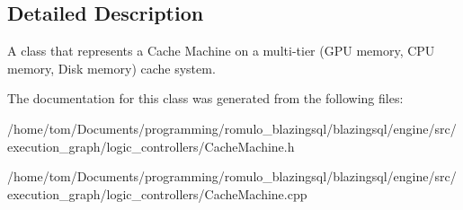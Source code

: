 \subsection{Detailed Description}
A class that represents a Cache Machine on a multi-\/tier (G\+PU memory, C\+PU memory, Disk memory) cache system. 

The documentation for this class was generated from the following files\+:\begin{DoxyCompactItemize}
\item 
/home/tom/\+Documents/programming/romulo\+\_\+blazingsql/blazingsql/engine/src/execution\+\_\+graph/logic\+\_\+controllers/Cache\+Machine.\+h\item 
/home/tom/\+Documents/programming/romulo\+\_\+blazingsql/blazingsql/engine/src/execution\+\_\+graph/logic\+\_\+controllers/Cache\+Machine.\+cpp\end{DoxyCompactItemize}
